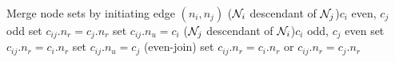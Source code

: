 \begin{algorithm}[htbp]
  
    \BlankLine
  
    Merge node sets by initiating edge $(n_i, n_j)$\;
    \uIf($\mathcal{N}_i$ descendant of $\mathcal{N}_j$){$c_i$ even, $c_j$ odd}{
      set $c_{ij}.n_r = c_j.n_r$\;
      set $c_{ij}.n_u = c_i$
    }
    \uElseIf($\mathcal{N}_j$ descendant of $\mathcal{N}_i$){$c_i$ odd, $c_j$ even}{
      set $c_{ij}.n_r = c_i.n_r$\;
      set $c_{ij}.n_u = c_j$
    }
    \Else(even-join){
      set $c_{ij}.n_r = c_i.n_r$ or $c_{ij}.n_r = c_j.n_r$\;
    }
    \caption{}\label{algo:join}
  \end{algorithm}
  